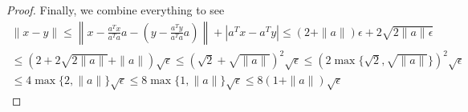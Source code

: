 \begin{proof}
% 



Finally, we combine everything to see
\begin{align*}
\|x - y\| 
\le \left\|x - \frac{a^Tx}{a^Ta} a - \left(y - \frac{a^Ty}{a^Ta} a\right)\right\| + |a^Tx - a^Ty|
\le (2 + \|a\|)\epsilon + 2\sqrt{2\|a\|\epsilon} \\
\le \left(2 + 2\sqrt{2\|a\|} + \|a\|\right)\sqrt{\epsilon}
\le \left(\sqrt{2} + \sqrt{\|a\|}\right)^2 \sqrt{\epsilon}
\le \left(2\max\{\sqrt{2},\sqrt{\|a\|}\}\right)^2 \sqrt{\epsilon} \\
\le 4\max\{2,\|a\|\} \sqrt{\epsilon}
\le 8\max\{1,\|a\|\} \sqrt{\epsilon}
\le 8(1 + \|a\|) \sqrt{\epsilon}
\end{align*}



\end{proof}
